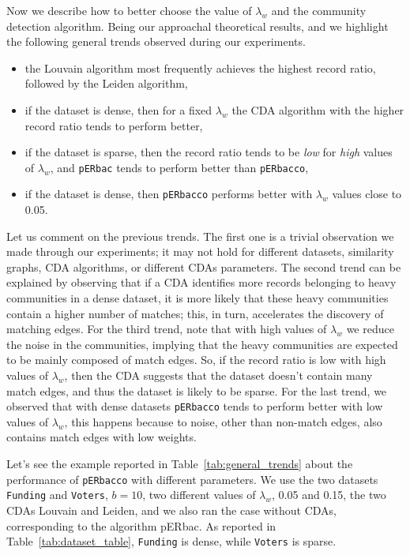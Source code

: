 \documentclass[sigconf, nonacm]{acmart}
\newcommand{\window}{b}
\newcommand{\perbacco}{\texttt{pERbacco}\xspace}
\newcommand{\perbac}{\texttt{pERbac}\xspace}
\newcommand{\funding}{\texttt{Funding}\xspace}
\newcommand{\voters}{\texttt{Voters}\xspace}
\begin{document}
Now we describe how to better choose the value of $\lambda_w$ and the community detection algorithm. Being our approachal theoretical results, and we highlight the following general trends observed during our experiments.

\begin{itemize}
    \item the Louvain algorithm most frequently achieves the highest record ratio, followed by the Leiden algorithm,
    \item if the dataset is dense, then for a fixed $\lambda_w$ the CDA algorithm with the higher record ratio tends to perform better,
    \item if the dataset is sparse, then the record ratio  tends to be \emph{low} for \emph{high} values of $\lambda_w$, and \perbac tends to perform better than \perbacco, 
    \item if the dataset is dense, then \perbacco performs better with $\lambda_w$ values close to 0.05.
\end{itemize}

Let us comment on the previous trends. The first one is a trivial observation we made through our experiments; it may not hold for different datasets, similarity graphs, CDA algorithms, or different CDAs parameters. The second trend can be explained by observing that if a CDA identifies more records belonging to heavy communities in a dense dataset, it is more likely that these heavy communities contain a higher number of matches; this, in turn, accelerates the discovery of matching edges. For the third trend, note that with high values of $\lambda_w$ we reduce the noise in the communities, implying that the heavy communities are expected to be mainly composed of match edges. So, if the record ratio is low with high values of $\lambda_w$, then the CDA suggests that the dataset doesn't contain many match edges, and thus the dataset is likely to be sparse. For the last trend, we observed that with dense datasets \perbacco tends to perform better with low values of $\lambda_w$, this happens because to noise, other than non-match edges, also contains match edges with low weights.


Let's see the example reported in Table~\ref{tab:general_trends} about the performance of \perbacco with different parameters. We use the two datasets \funding and \voters, $\window = 10$, two different values of $\lambda_w$, 0.05 and 0.15, the two CDAs Louvain and Leiden, and we also ran the case without CDAs, corresponding to the algorithm pERbac. As reported in Table~\ref{tab:dataset_table}, \funding is dense, while \voters is sparse. 
\end{document}
